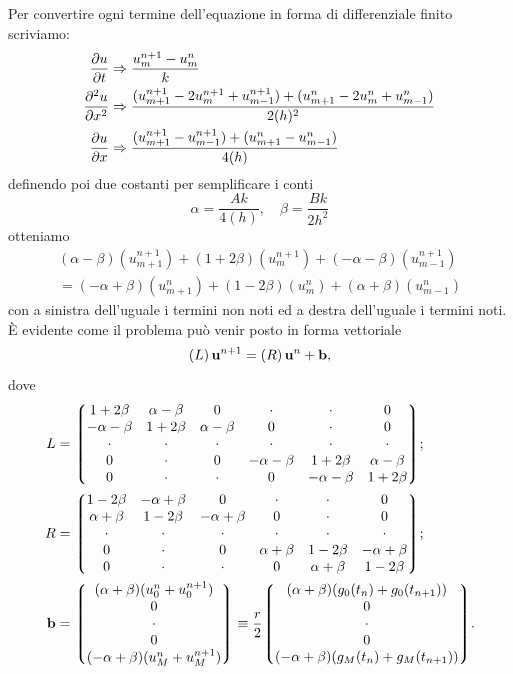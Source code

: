 \documentclass[10pt,a4paper]{article}
\begin{document}
Per convertire ogni termine dell'equazione in forma di differenziale finito scriviamo:
\begin{align}
	\pdv{u}{t} &\Rightarrow \frac{u_m^{n+1}-u_m^n}{k}\\
	\pdv[2]{u}{x} &\Rightarrow \frac{(u_{m+1}^{n+1}-2u_m^{n+1}+u_{m-1}^{n+1}) +(u_{m+1}^{n}-2u_m^{n}+u_{m-1}^{n})}{2(h)^2}\\
	\pdv{u}{x} &\Rightarrow \frac{(u_{m+1}^{n+1}-u_{m-1}^{n+1})+(u_{m+1}^n -u_{m-1}^n)}{4(h)}
\end{align}
definendo poi due costanti per semplificare i conti
\begin{equation}
	\alpha = \frac{Ak}{4(h)}, \quad \beta = \frac{Bk}{2 h^2}
\end{equation}
otteniamo
\begin{multline}
	(\alpha - \beta)(u_{m+1}^{n+1}) + (1 + 2\beta)(u_m^{n+1}) + (-\alpha -\beta)(u_{m-1}^{n+1}) \\= (-\alpha + \beta)(u_{m+1}^n) +(1 -2\beta)(u_m^n) + (\alpha + \beta)(u_{m-1}^n)
\end{multline}
con a sinistra dell'uguale i termini non noti ed a destra dell'uguale i termini noti. È evidente come il problema può venir posto in forma vettoriale
\begin{equation}
	\left(L\right)\vb{u}^{n+1} = \left(R\right)\vb{u}^n + \vb{b},
\end{equation}
dove
\begin{align}
	L &= \mqty*(1+2\beta & \alpha - \beta & 0 & \cdot & \cdot & 0 \\ -\alpha -\beta & 1+2\beta & \alpha-\beta & 0 & \cdot & 0 \\ \cdot & \cdot & \cdot & \cdot & \cdot & \cdot \\ 0 & \cdot & 0 & -\alpha -\beta & 1+2\beta & \alpha-\beta \\ 0 & \cdot & \cdot & 0 & -\alpha-\beta & 1+2\beta);\\
	R &= \mqty*(1-2\beta & -\alpha + \beta & 0 & \cdot & \cdot & 0 \\ \alpha +\beta & 1-2\beta & -\alpha+\beta & 0 & \cdot & 0 \\ \cdot & \cdot & \cdot & \cdot & \cdot & \cdot \\ 0 & \cdot & 0 & \alpha +\beta & 1-2\beta & -\alpha+\beta \\ 0 & \cdot & \cdot & 0 & \alpha+\beta & 1-2\beta);\\
	\vb{b} &= \mqty*((\alpha + \beta)(u_0^n + u_0^{n+1}) \\ 0 \\ \cdot \\ 0 \\ (-\alpha + \beta)(u_M^n + u_M^{n+1})) \equiv \frac{r}{2}\mqty*((\alpha + \beta)(g_0(t_n) + g_0(t_{n+1})) \\ 0 \\ \cdot \\ 0 \\ (-\alpha + \beta)(g_M(t_n) + g_M(t_{n+1}))).
\end{align}
\end{document}
